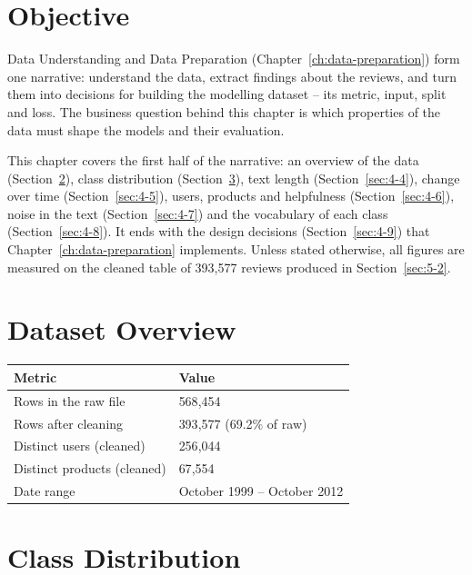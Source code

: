 \section{Objective}
\label{sec:4-1}

Data Understanding and Data Preparation (Chapter~\ref{ch:data-preparation}) form one narrative: understand the data, extract findings about the reviews, and turn them into decisions for building the modelling dataset -- its metric, input, split and loss. The business question behind this chapter is which properties of the data must shape the models and their evaluation.

This chapter covers the first half of the narrative: an overview of the data (Section~\ref{sec:4-2}), class distribution (Section~\ref{sec:4-3}), text length (Section~\ref{sec:4-4}), change over time (Section~\ref{sec:4-5}), users, products and helpfulness (Section~\ref{sec:4-6}), noise in the text (Section~\ref{sec:4-7}) and the vocabulary of each class (Section~\ref{sec:4-8}). It ends with the design decisions (Section~\ref{sec:4-9}) that Chapter~\ref{ch:data-preparation} implements. Unless stated otherwise, all figures are measured on the cleaned table of 393{,}577 reviews produced in Section~\ref{sec:5-2}.

\section{Dataset Overview}
\label{sec:4-2}

\begin{center}
\begin{tabular}{@{}p{6cm}p{7.5cm}@{}}
    \toprule
    Metric & Value \\
    \midrule
    Rows in the raw file & 568{,}454 \\
    Rows after cleaning & 393{,}577 (69.2\% of raw) \\
    Distinct users (cleaned) & 256{,}044 \\
    Distinct products (cleaned) & 67{,}554 \\
    Date range & October 1999 -- October 2012 \\
    \bottomrule
\end{tabular}
\end{center}

\section{Class Distribution}
\label{sec:4-3}

